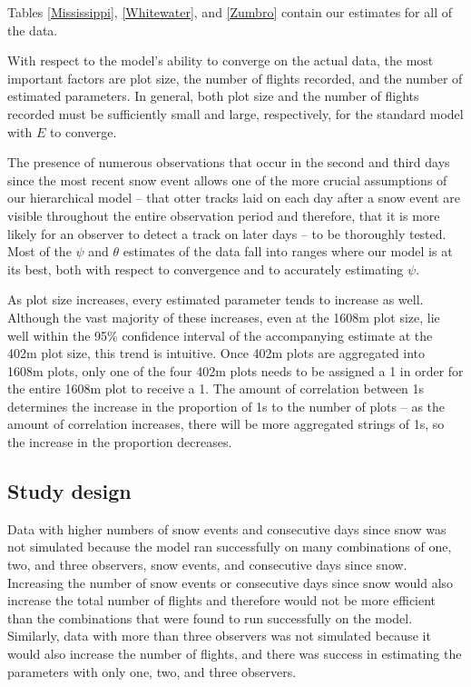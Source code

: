 \documentclass[11pt]{article}
\begin{document}
    Tables \ref{Mississippi}, \ref{Whitewater}, and \ref{Zumbro} contain our
    estimates for all of the data.

    With respect to the model's ability to converge on the actual data, the
    most important factors are plot size, the number of flights recorded, and
    the number of estimated parameters. In general, both plot size and the
    number of flights recorded must be sufficiently small and large,
    respectively, for the standard model with \(E\) to converge.

    The presence of numerous observations that occur in the second and third
    days since the most recent snow event allows one of the more crucial
    assumptions of our hierarchical model -- that otter tracks laid on each day
    after a snow event are visible throughout the entire observation period and
    therefore, that it is more likely for an observer to detect a track on
    later days -- to be thoroughly tested. Most of the \(\psi\) and \(\theta\)
    estimates of the data fall into ranges where our model is at its best, both
    with respect to convergence and to accurately estimating \(\psi\).

    As plot size increases, every estimated parameter tends to increase as
    well.  Although the vast majority of these increases, even at the 1608m
    plot size, lie well within the 95\% confidence interval of the accompanying
    estimate at the 402m plot size, this trend is intuitive. Once 402m plots
    are aggregated into 1608m plots, only one of the four 402m plots needs to
    be assigned a 1 in order for the entire 1608m plot to receive a 1. The
    amount of correlation between 1s determines the increase in the proportion
    of 1s to the number of plots -- as the amount of correlation increases,
    there will be more aggregated strings of 1s, so the increase in the
    proportion decreases.

    \subsection{Study design}

    Data with higher numbers of snow events and consecutive days since snow was
    not simulated because the model ran successfully on many combinations of
    one, two, and three observers, snow events, and consecutive days since
    snow.  Increasing the number of snow events or consecutive days since snow
    would also increase the total number of flights and therefore would not be
    more efficient than the combinations that were found to run successfully on
    the model.  Similarly, data with more than three observers was not
    simulated because it would also increase the number of flights, and there
    was success in estimating the parameters with only one, two, and three
    observers.
\end{document}
